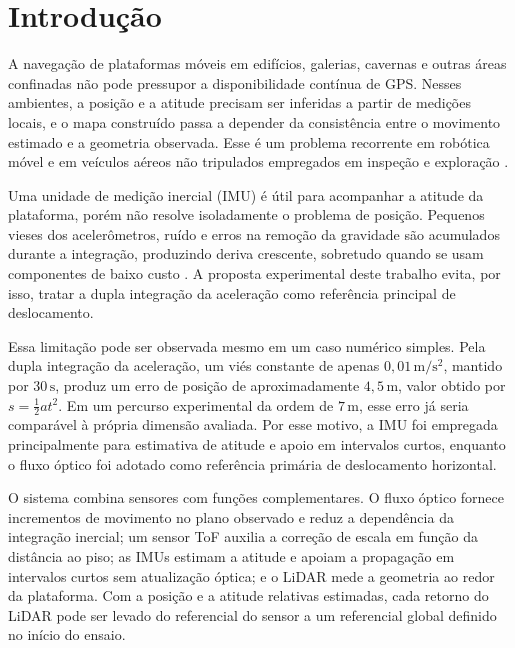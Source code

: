 \section{Introdução}
\label{sec:introducao}

A navegação de plataformas móveis em edifícios, galerias, cavernas e outras áreas confinadas não pode pressupor a disponibilidade contínua de GPS. Nesses ambientes, a posição e a atitude precisam ser inferidas a partir de medições locais, e o mapa construído passa a depender da consistência entre o movimento estimado e a geometria observada. Esse é um problema recorrente em robótica móvel e em veículos aéreos não tripulados empregados em inspeção e exploração \parencite{thrun2005probabilistic,beardMcLain2012}.

Uma unidade de medição inercial (IMU) é útil para acompanhar a atitude da plataforma, porém não resolve isoladamente o problema de posição. Pequenos vieses dos acelerômetros, ruído e erros na remoção da gravidade são acumulados durante a integração, produzindo deriva crescente, sobretudo quando se usam componentes de baixo custo \parencite{tittertonWeston2004,groves2013principles,farrell2008aided}. A proposta experimental deste trabalho evita, por isso, tratar a dupla integração da aceleração como referência principal de deslocamento.

Essa limitação pode ser observada mesmo em um caso numérico simples. Pela dupla integração da aceleração, um viés constante de apenas $0{,}01\,\mathrm{m/s^2}$, mantido por $30\,\mathrm{s}$, produz um erro de posição de aproximadamente $4{,}5\,\mathrm{m}$, valor obtido por $s = \frac{1}{2}at^2$. Em um percurso experimental da ordem de $7\,\mathrm{m}$, esse erro já seria comparável à própria dimensão avaliada. Por esse motivo, a IMU foi empregada principalmente para estimativa de atitude e apoio em intervalos curtos, enquanto o fluxo óptico foi adotado como referência primária de deslocamento horizontal.

O sistema combina sensores com funções complementares. O fluxo óptico fornece incrementos de movimento no plano observado e reduz a dependência da integração inercial; um sensor ToF auxilia a correção de escala em função da distância ao piso; as IMUs estimam a atitude e apoiam a propagação em intervalos curtos sem atualização óptica; e o LiDAR mede a geometria ao redor da plataforma. Com a posição e a atitude relativas estimadas, cada retorno do LiDAR pode ser levado do referencial do sensor a um referencial global definido no início do ensaio.

